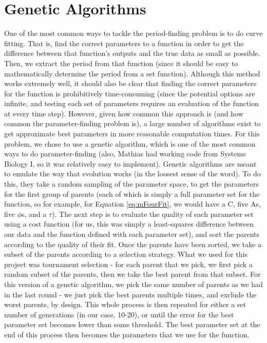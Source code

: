 \documentclass[conference]{IEEEtran}
\begin{document}
\section{Genetic Algorithms}
One of the most common ways to tackle the period-finding problem is to do curve fitting. That is, find the correct parameters to a function in order to get the difference between that function’s outputs and the true data as small as possible. Then, we extract the period from that function (since it should be easy to mathematically determine the period from a set function). Although this method works extremely well, it should also be clear that finding the correct parameters for the function is prohibitively time-consuming (since the potential options are infinite, and testing each set of parameters requires an evaluation of the function at every time step). However, given how common this approach is (and how common the parameter-finding problem is), a large number of algorithms exist to get approximate best parameters in more reasonable computation times.
For this problem, we chose to use a genetic algorithm, which is one of the most common ways to do parameter-finding (also, Mathias had working code from Systems Biology I, so it was relatively easy to implement). Genetic algorithms are meant to emulate the way that evolution works (in the loosest sense of the word). To do this, they take a random sampling of the parameter space, to get the parameters for the first group of parents (each of which is simply a full parameter set for the function, so for example, for Equation \ref{eq:mFourFit}, we would have a C, five As, five {$\phi$}s, and a $\tau$). The next step is to evaluate the quality of each parameter set using a cost function (for us, this was simply a least-squares difference between our data and the function defined with each parameter set), and sort the parents according to the quality of their fit. Once the parents have been sorted, we take a subset of the parents according to a selection strategy. What we used for this project was tournament selection - for each parent that we pick, we first pick a random subset of the parents, then we take the best parent from that subset. For this version of a genetic algorithm, we pick the same number of parents as we had in the last round - we just pick the best parents multiple times, and exclude the worst parents, by design. This whole process is then repeated for either a set number of generations (in our case, 10-20), or until the error for the best parameter set becomes lower than some threshold. The best parameter set at the end of this process then becomes the parameters that we use for the function.
\end{document}
